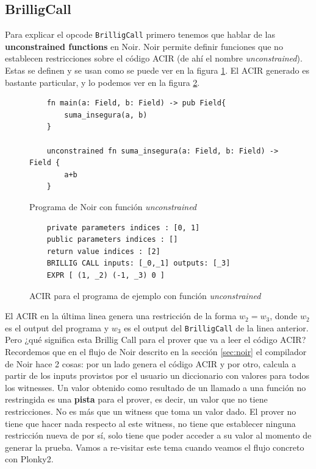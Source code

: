 \subsection{BrilligCall}
Para explicar el opcode \texttt{BrilligCall} primero tenemos que hablar de las \textbf{unconstrained functions} en Noir. Noir permite definir funciones que no establecen restricciones sobre el código ACIR (de ahí el nombre \textit{unconstrained}). Estas se definen y se usan como se puede ver en la figura \ref{fig:noir_ejemplo_unconstrained}. El ACIR generado es bastante particular, y lo podemos ver en la figura \ref{fig:ACIR_ejemplo_unconstrained}. 

\begin{figure} 
    \centering
    \begin{verbatim}
    fn main(a: Field, b: Field) -> pub Field{
        suma_insegura(a, b)
    }
    
    unconstrained fn suma_insegura(a: Field, b: Field) -> Field {
        a+b
    }
    \end{verbatim}
    \caption{Programa de Noir con función \textit{unconstrained}}
    \label{fig:noir_ejemplo_unconstrained}
\end{figure}
\begin{figure} 
    \centering
    \begin{verbatim}
    private parameters indices : [0, 1]
    public parameters indices : []
    return value indices : [2]
    BRILLIG CALL inputs: [_0,_1] outputs: [_3]
    EXPR [ (1, _2) (-1, _3) 0 ]
    \end{verbatim}
    \caption{ACIR para el programa de ejemplo con función \textit{unconstrained}}
    \label{fig:ACIR_ejemplo_unconstrained}
\end{figure}

El ACIR en la última linea genera una restricción de la forma $w_2 = w_3$, donde $w_2$ es el output del programa y $w_3$ es el output del \texttt{BrilligCall} de la linea anterior. Pero ¿qué significa esta Brillig Call para el prover que va a leer el código ACIR? Recordemos que en el flujo de Noir descrito en la sección \ref{sec:noir} el compilador de Noir hace 2 cosas: por un lado genera el código ACIR y por otro, calcula a partir de los inputs provistos por el usuario un diccionario con valores para todos los witnesses. Un valor obtenido como resultado de un llamado a una función no restringida es una \textbf{pista} para el prover, es decir, un valor que no tiene restricciones. No es más que un witness que toma un valor dado. El prover no tiene que hacer nada respecto al este witness, no tiene que establecer ninguna restricción nueva de por sí, solo tiene que poder acceder a su valor al momento de generar la prueba. Vamos a re-visitar este tema cuando veamos el flujo concreto con Plonky2. 

